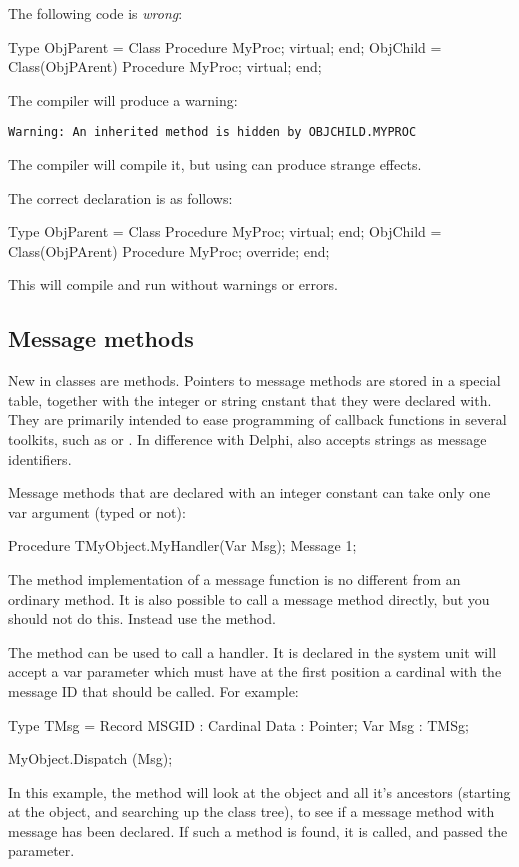 \documentclass{report}
\begin{document}
The following code is {\em wrong}:
\begin{listing}
Type ObjParent = Class
        Procedure MyProc; virtual;
     end;
     ObjChild  = Class(ObjPArent)
       Procedure MyProc; virtual;
     end;
\end{listing}     
The compiler will produce a warning:
\begin{verbatim}
Warning: An inherited method is hidden by OBJCHILD.MYPROC
\end{verbatim}
The compiler will compile it, but using  can
produce strange effects.

The correct declaration is as follows:
\begin{listing}
Type ObjParent = Class
        Procedure MyProc; virtual;
     end;
     ObjChild  = Class(ObjPArent)
       Procedure MyProc; override;
     end;
\end{listing}
This will compile and run without warnings or errors.

\subsection{Message methods}
New in classes are  methods. Pointers to message methods are 
stored in a special table, together with the integer or string cnstant that
they were declared with. They are primarily intended to ease programming of
callback functions in several  toolkits, such as  or
. In difference with Delphi, \fpc also accepts strings as message
identifiers.

Message methods that are declared with an integer constant can take only one
var argument (typed or not):
\begin{listing}
 Procedure TMyObject.MyHandler(Var Msg); Message 1;
\end{listing}
The method implementation of a message function is no different from an
ordinary method. It is also possible to call a message method directly,
but you should not do this. Instead use the  method.

The  method can be used to call a 
handler. It is  declared in the system unit will accept a var parameter 
which must have at the first position a cardinal with the message ID that
should be called. For example:
\begin{listing}
Type 
  TMsg = Record
    MSGID : Cardinal
    Data : Pointer;
Var
  Msg : TMSg;

MyObject.Dispatch (Msg);
\end{listing}
In this example, the  method will look at the object and all 
it's ancestors (starting at the object, and searching up the class tree), 
to see if a message method with message  has been
declared. If such a method is found, it is called, and passed the 
 parameter.
\end{document}
